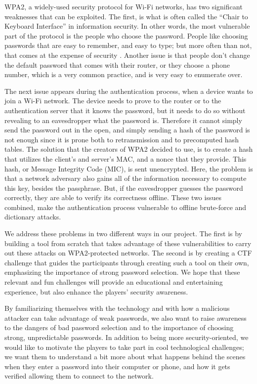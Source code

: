 \documentclass[sigconf]{acmart}
\begin{document}
WPA2, a widely-used security protocol for Wi-Fi networks, has two significant weaknesses that can be exploited. The first, is what is often called the “Chair to Keyboard Interface” in information security. In other words, the most vulnerable part of the protocol is the people who choose the password. People like choosing passwords that are easy to remember, and easy to type; but more often than not, that comes at the expense of security \cite{moskowitz2003weakness}. Another issue is that people don’t change the default password that comes with their router, or they choose a phone number, which is a very common practice, and is very easy to enumerate over.

The next issue appears during the authentication process, when a device wants to join a Wi-Fi network. The device needs to prove to the router or to the authentication server that it knows the password, but it needs to do so without revealing to an eavesdropper what the password is. Therefore it cannot simply send the password out in the open, and simply sending a hash of the password is not enough since it is prone both to retransmission and to precomputed hash tables. The solution that the creators of WPA2 decided to use, is to create a hash that utilizes the client’s and server’s MAC, and a nonce that they provide. This hash, or Message Integrity Code (MIC), is sent unencrypted. Here, the problem is that a network adversary also gains all of the information necessary to compute this key, besides the passphrase. But, if the eavesdropper guesses the password correctly, they are able to verify its correctness offline. These two issues combined, make the authentication process vulnerable to offline brute-force and dictionary attacks.

We address these problems in two different ways in our project. 
The first is by building a tool from scratch that takes advantage of these vulnerabilities to carry out these attacks on WPA2-protected networks. The second is by creating a CTF challenge that guides the participants through creating such a tool on their own, emphasizing the importance of strong password selection. We hope that these relevant and fun challenges will provide an educational and entertaining experience, but also enhance the players' security awareness.  

By familiarizing themselves with the technology and with how a malicious attacker can take advantage of weak passwords, we also want to raise awareness to the dangers of bad password selection and to the importance of choosing strong, unpredictable passwords.
In addition to being more security-oriented, we would like to motivate the players to take part in cool technological challenges; we want them to understand a bit more about what happens behind the scenes when they enter a password into their computer or phone, and how it gets verified allowing them to connect to the network.
\end{document}
